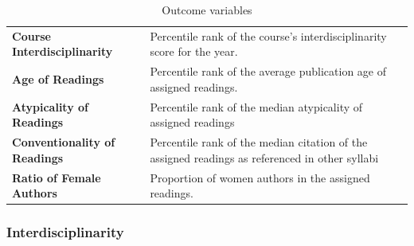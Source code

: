 \documentclass[
  11pt, %
]{article}
\providecommand{\DIFaddbeginFL}{} %
\providecommand{\DIFaddendFL}{} %
\providecommand{\DIFdelbeginFL}{} %
\providecommand{\DIFdelendFL}{} %
\newcommand{\DIFscaledelfig}{0.5}
\newlength{\DIFdelgraphicswidth} %
\newlength{\DIFdelgraphicsheight} %
\newcommand{\DIFaddincludegraphics}[2][]{{\color{blue}\fbox{\DIFOincludegraphics[#1]{#2}}}} %
\newcommand{\DIFdelincludegraphics}[2][]{%
\sbox{\DIFdelgraphicsbox}{\DIFOincludegraphics[#1]{#2}}%
\settoboxwidth{\DIFdelgraphicswidth}{\DIFdelgraphicsbox} %
\settoboxtotalheight{\DIFdelgraphicsheight}{\DIFdelgraphicsbox} %
\scalebox{\DIFscaledelfig}{%
\parbox[b]{\DIFdelgraphicswidth}{\usebox{\DIFdelgraphicsbox}\\[-\baselineskip] \rule{\DIFdelgraphicswidth}{0em}}\llap{\resizebox{\DIFdelgraphicswidth}{\DIFdelgraphicsheight}{%
\setlength{\unitlength}{\DIFdelgraphicswidth}%
\begin{picture}(1,1)%
\thicklines\linethickness{2pt} %
{\color[rgb]{1,0,0}\put(0,0){\framebox(1,1){}}}%
{\color[rgb]{1,0,0}\put(0,0){\line( 1,1){1}}}%
{\color[rgb]{1,0,0}\put(0,1){\line(1,-1){1}}}%
\end{picture}%
}\hspace*{3pt}}} %
} %
\DeclareRobustCommand{\DIFaddbeginFL}{\DIFOaddbeginFL \let\includegraphics\DIFaddincludegraphics} %
\DeclareRobustCommand{\DIFaddendFL}{\DIFOaddendFL \let\includegraphics\DIFOincludegraphics} %
\DeclareRobustCommand{\DIFdelbeginFL}{\DIFOdelbeginFL \let\includegraphics\DIFdelincludegraphics} %
\DeclareRobustCommand{\DIFdelendFL}{\DIFOaddendFL \let\includegraphics\DIFOincludegraphics} %
\begin{document}
\begin{table}
\centering\centering
\caption{\DIFdelbeginFL %
\DIFdelendFL \DIFaddbeginFL \label{tab:outcomes}\DIFaddendFL Outcome variables}
\centering
\DIFdelbeginFL %
\DIFdelendFL \DIFaddbeginFL \begin{tabu} to 
\toprule
{} & \\
\midrule
\textbf{Course Interdisciplinarity} & Percentile rank of the course's interdisciplinarity score for the year.\\
\addlinespace
\textbf{Age of Readings} & Percentile rank of the average publication age of assigned readings.\\
\addlinespace
\textbf{Atypicality of Readings} & Percentile rank of the median atypicality of assigned readings\\
\addlinespace
\textbf{Conventionality of Readings} & Percentile rank of the median citation of the assigned readings as referenced in other syllabi\\
\addlinespace
\textbf{Ratio of Female Authors} & Proportion of women authors in the assigned readings.\\
\bottomrule
\end{tabu}
\DIFaddendFL 
\end{table}

\subsubsection{Interdisciplinarity}\label{interdisciplinarity}
\end{document}
